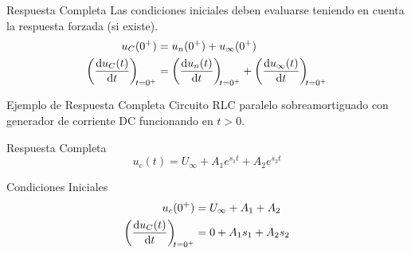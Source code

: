 \documentclass[aspectratio=169, usenames,svgnames,dvipsnames]{beamer}
\begin{document}
\begin{frame}[label={sec:org07889ef}]{Respuesta Completa}
Las condiciones iniciales deben evaluarse teniendo en cuenta la respuesta forzada (si existe).
\begin{align*}
  u_C(0^+) &= u_n(0^+) + u_{\infty}(0^+)\\
  \diff{u_C(t)}{t}[t = 0^+] &= \diff{u_n(t)}{t}[t = 0^+] + \diff{u_{\infty}(t)}{t}[t = 0^+]  
\end{align*}
\end{frame}
\begin{frame}[label={sec:org063f7c6}]{Ejemplo de Respuesta Completa}
Circuito RLC paralelo sobreamortiguado con generador de corriente DC funcionando en \(t > 0\). 
\begin{block}{Respuesta Completa}
\[
  u_c(t) = U_{\infty} + A_1 e^{s_1 t} + A_2 e^{s_2 t}
\]
\end{block}
\begin{block}{Condiciones Iniciales}
\begin{align*}
u_c(0^+) &= U_\infty + A_1 + A_2\\
\diff{u_C(t)}{t}[t = 0^+] &= 0 + A_1 s_1 + A_2 s_2
\end{align*}
\end{block}
\end{frame}
\end{document}
